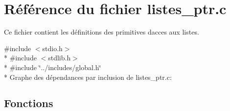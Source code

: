 \hypertarget{a00025}{}\section{Référence du fichier listes\+\_\+ptr.\+c}
\label{a00025}


Ce fichier contient les définitions des primitives d\textquotesingle{}acces aux listes.  


{\ttfamily \#include $<$stdio.\+h$>$}\\*
{\ttfamily \#include $<$stdlib.\+h$>$}\\*
{\ttfamily \#include \char`\"{}../includes/global.\+h\char`\"{}}\\*
Graphe des dépendances par inclusion de listes\+\_\+ptr.\+c\+:
\subsection*{Fonctions}
